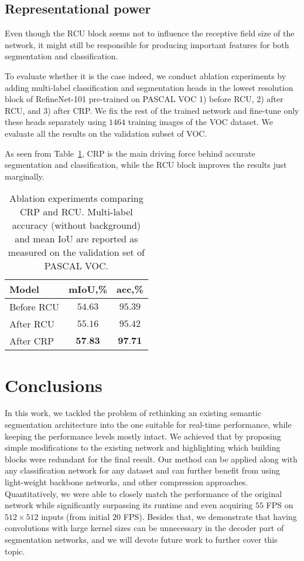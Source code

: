 \documentclass{bmvc2k}
\begin{document}
\subsection{Representational power}
\label{ss:abl}
Even though the RCU block seems not to influence the receptive field size of the network, it might still be responsible for producing important features for both segmentation and classification.

To evaluate whether it is the case indeed, we conduct ablation experiments by adding multi-label classification and segmentation heads in the lowest resolution block of RefineNet-101 pre-trained on PASCAL VOC 1) before RCU, 2) after RCU, and 3) after CRP. We fix the rest of the trained network and fine-tune only these heads separately using $1464$ training images of the VOC dataset. We evaluate all the results on the validation subset of VOC.

As seen from Table~\ref{table:crprcu}, CRP is the main driving force behind accurate segmentation and classification, while the RCU block improves the results just marginally. 


\begin{table}
	\begin{center}
		\begin{tabular}{l|c|c}
			\hline Model & mIoU,\% & acc,\%\\
\hline
Before RCU  & $54.63$ & $95.39$\\
			After RCU  & $55.16$ & $95.42$\\
			After CRP  & $\textbf{57.83}$ & $\textbf{97.71}$\\
			\hline
		\end{tabular}
	\end{center}
	\caption{Ablation experiments comparing CRP and RCU. Multi-label accuracy (without background) and mean IoU are reported as measured on the validation set of PASCAL VOC.\label{table:crprcu}}
\vskip -0.15in
\end{table}


\section{Conclusions}

In this work, we tackled the problem of rethinking an existing semantic segmentation architecture into the one suitable for real-time performance, while keeping the performance levels mostly intact. We achieved that by proposing simple modifications to the existing network and highlighting which building blocks were redundant for the final result. Our method can be applied along with any classification network for any dataset and can further benefit from using light-weight backbone networks, and other compression approaches. Quantitatively, we were able to closely match the performance of the original network while significantly surpassing its runtime and even acquiring $55$ FPS on $512\times512$ inputs (from initial $20$ FPS). Besides that, we demonstrate that having convolutions with large kernel sizes can be unnecessary in the decoder part of segmentation networks, and we will devote future work to further cover this topic.\\
\end{document}
